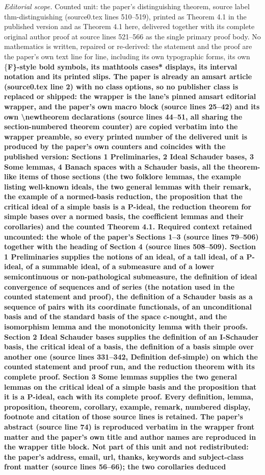 \documentclass[10pt,a4paper]{amsart}
\begin{document}
\noindent\textit{Editorial scope.} Counted unit: the paper's distinguishing theorem, source label thm-distinguishing (source0.tex lines 510--519), printed as Theorem 4.1 in the published version and as Theorem 4.1 here, delivered together with its complete original author proof at source lines 521--566 as the single primary proof body. No mathematics is written, repaired or re-derived: the statement and the proof are the paper's own text line for line, including its own typographic forms, its own \{\bf F\}-style bold symbols, its mathtools cases* displays, its interval notation and its printed slips. The paper is already an amsart article (source0.tex line 2) with no class options, so no publisher class is replaced or shipped: the wrapper is the lane's pinned amsart editorial wrapper, and the paper's own macro block (source lines 25--42) and its own \textbackslash{}newtheorem declarations (source lines 44--51, all sharing the section-numbered theorem counter) are copied verbatim into the wrapper preamble, so every printed number of the delivered unit is produced by the paper's own counters and coincides with the published version: Sections 1 Preliminaries, 2 Ideal Schauder bases, 3 Some lemmas, 4 Banach spaces with a Schauder basis, all the theorem-like items of those sections (the two folklore lemmas, the example listing well-known ideals, the two general lemmas with their remark, the example of a normed-basis reduction, the proposition that the critical ideal of a simple basis is a P-ideal, the reduction theorem for simple bases over a normed basis, the coefficient lemmas and their corollaries) and the counted Theorem 4.1. Required context retained uncounted: the whole of the paper's Sections 1--3 (source lines 79--506) together with the heading of Section 4 (source lines 508--509). Section 1 Preliminaries supplies the notions of an ideal, of a tall ideal, of a P-ideal, of a summable ideal, of a submeasure and of a lower semicontinuous or non-pathological submeasure, the definition of ideal convergence of sequences and of series (the notation used in the counted statement and proof), the definition of a Schauder basis as a sequence of pairs with its coordinate functionals, of an unconditional basis and of the standard basis of the space c-nought, and the isomorphism lemma and the monotonicity lemma with their proofs. Section 2 Ideal Schauder bases supplies the definition of an I-Schauder basis, the critical ideal of a basis, the definition of a basis simple over another one (source lines 331--342, Definition def-simple) on which the counted statement and proof run, and the reduction theorem with its complete proof. Section 3 Some lemmas supplies the two general lemmas on the critical ideal of a simple basis and the proposition that it is a P-ideal, each with its complete proof. Every definition, lemma, proposition, theorem, corollary, example, remark, numbered display, footnote and citation of those source lines is retained. The paper's abstract (source line 74) is reproduced verbatim in the wrapper front matter and the paper's own title and author names are reproduced in the wrapper title block. Not part of this unit and not redistributed: the paper's address, email, url, thanks, keywords and subject-class front matter (source lines 56--66); the two corollaries deduced 
\end{document}
